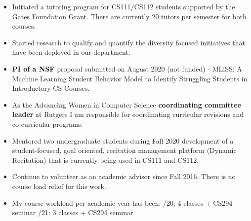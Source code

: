 \documentclass[11pt]{article}
\begin{document}
\begin{itemize}
  \item Initiated a tutoring program for CS111/CS112 students
    supported by the Gates Foundation Grant. There are currently 20
    tutors per semester for both courses.
  
  \item Started research to qualify and quantify the diversity focused initiatives that have been deployed in our department.
    
  \item {\bf PI of a NSF} proposal submitted on August 2020 (not funded) -
    MLiSS: A Machine Learning Student Behavior Model to Identify
    Struggling Students in Introductory CS Courses.
    
  \item As the Advancing Women in Computer Science {\bf coordinating
    committee leader} at Rutgers I am responsible for coordinating
    curricular revisions and co-curricular programs.
    
  \item Mentored two undergraduate students during Fall 2020
    development of a student-focused, goal oriented, recitation
    management platform (Dynamic Recitation) that is currently being
    used in CS111 and CS112.
    
  \item Continue to volunteer as an academic advisor since Fall
    2016. There is no course load relief for this work.

  \item My course workload per academic year has been:
    /20: 4 classes + CS294 seminar
    /21: 3 classes + CS294 seminar
  
\end{itemize}
\end{document}

